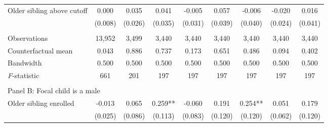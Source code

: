 \begin{table}[!htbp]
{{\begin{tabular}{lcccccccc}
Older sibling above cutoff&       0.000   &       0.035   &       0.041   &      -0.005   &       0.057   &      -0.006   &      -0.020   &       0.016   \\
                    &     (0.008)   &     (0.026)   &     (0.035)   &     (0.031)   &     (0.039)   &     (0.040)   &     (0.024)   &     (0.041)   \\
                    &               &               &               &               &               &               &               &               \\
Observations        &      13,952   &       3,499   &       3,440   &       3,440   &       3,440   &       3,440   &       3,440   &       3,440   \\
Counterfactual mean &       0.043   &       0.886   &       0.737   &       0.173   &       0.651   &       0.486   &       0.094   &       0.402   \\
Bandwidth           &       0.500   &       0.500   &       0.500   &       0.500   &       0.500   &       0.500   &       0.500   &       0.500   \\
\textit{F}-statistic&         661   &         201   &         197   &         197   &         197   &         197   &         197   &         197   \\
 
&  &  &  &  \\
\multicolumn{10}{l}{Panel B: Focal child is a male} \\
Older sibling enrolled&      -0.013   &       0.065   &       0.259** &      -0.060   &       0.191   &       0.254** &       0.051   &       0.179   \\
                    &     (0.025)   &     (0.086)   &     (0.113)   &     (0.083)   &     (0.120)   &     (0.120)   &     (0.062)   &     (0.120)   \\
 

\end{tabular}}}
\end{table}
